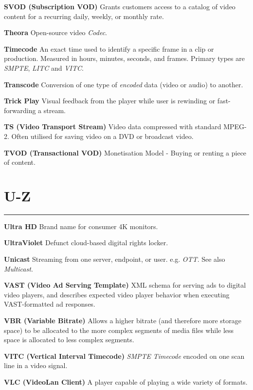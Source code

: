 \smallskip
\textbf{SVOD (Subscription VOD)}
Grants customers access to a catalog of video content for a recurring daily, weekly, or monthly rate.

\smallskip
\textbf{Theora}
Open-source video \textit{Codec}.

\smallskip
\textbf{Timecode}
An exact time used to identify a specific frame in a clip or production. Measured in hours, minutes, seconds, and frames. Primary types are \textit{SMPTE}, \textit{LITC} and \textit{VITC}.

\smallskip
\textbf{Transcode}
Conversion of one type of \textit{encoded} data (video or audio) to another.

\smallskip
\textbf{Trick Play}
Visual feedback from the player while user is rewinding or fast-forwarding a stream.

\smallskip
\textbf{TS (Video Transport Stream)}
Video data compressed with standard MPEG-2. Often utilised for saving video on a DVD or broadcast video.

\smallskip
\textbf{TVOD (Transactional VOD)}
Monetisation Model - Buying or renting a piece of content.

\section{U-Z}
\hrule

\medskip
\textbf{Ultra HD}
Brand name for consumer 4K monitors.

\smallskip
\textbf{UltraViolet}
Defunct cloud-based digital rights locker.

\smallskip
\textbf{Unicast}
Streaming from one server, endpoint, or user. e.g. \textit{OTT}.  See also \textit{Multicast}.

\smallskip
\textbf{VAST (Video Ad Serving Template)}
XML schema for serving ads to digital video players, and describes expected video player behavior when executing VAST-formatted ad responses.

\smallskip
\textbf{VBR (Variable Bitrate)}
Allows a higher bitrate (and therefore more storage space) to be allocated to the more complex segments of media files while less space is allocated to less complex segments.

\smallskip
\textbf{VITC (Vertical Interval Timecode)}
\textit{SMPTE} \textit{Timecode} encoded on one scan line in a video signal.

\smallskip
\textbf{VLC (VideoLan Client)}
A player capable of playing a wide variety of formats.

